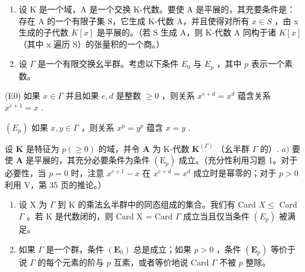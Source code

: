 \BourbakiExerciseGroup

\begin{enumerate}
\def\labelenumi{\arabic{enumi})}
\item
  设 K 是一个域，A 是一个交换 K-代数。要使 A 是平展的，其充要条件是：存在 A 的一个有限子集 S，它生成 K-代数 A，并且使得对所有 \(x \in S\) ，由 x 生成的子代数 \(K[x]\) 是平展的。（若 S 生成 A，则 K-代数 A 同构于诸 \(K[x]\) （其中 x 遍历 S）的张量积的一个商。）
\item
  设 \(\Gamma\) 是一个有限交换幺半群。考虑以下条件 \(E_0\) 与 \(E_p\) ，其中 \(p\) 表示一个素数。
\end{enumerate}

(E0) 如果 \(x \in \Gamma\) 并且如果 \(e, d\) 是整数 \(\geqslant 0\) ，则关系 \(x^{e + d} = x^d\) 蕴含关系 \(x^{e + 1} = x\) .

\((E_p)\) 如果 \(x, y \in \Gamma\) ，则关系 \(x^p = y^p\) 蕴含 \(x = y\) .

设 \(\mathbf{K}\) 是特征为 \(p (\geqslant 0)\) 的域，并令 \(\mathbf{A}\) 为 K-代数 \(\mathbf{K}^{(\Gamma)}\) （幺半群 \(\Gamma\) 的）. \(a)\) 要使 \(\mathbf{A}\) 是平展的，其充分必要条件为条件 \((\mathrm{E}_p)\) 成立。（充分性利用习题 1。对于必要性，当 \(p = 0\) 时，注意 \(x^{e+1} - x\) 在 \(x^{e+d} = x^d\) 成立时是幂零的；对于 \(p > 0\) 利用 V，第 35 页的推论。）

\begin{enumerate}
\def\labelenumi{\alph{enumi})}
\setcounter{enumi}{1}
\item
  设 X 为 \(\Gamma\) 到 K 的乘法幺半群中的同态组成的集合。我们有 Card \(X \leqslant\) Card \(\Gamma\) 。若 K 是代数闭的，则 Card X = Card \(\Gamma\) 成立当且仅当条件 \((E_{p})\) 被满足。
\item
  如果 \(\Gamma\) 是一个群，条件 \((\mathbf{E}_0)\) 总是成立；如果 \(p > 0\) ，条件 \((\mathbf{E}_p)\) 等价于说 \(\Gamma\) 的每个元素的阶与 \(p\) 互素，或者等价地说 Card \(\Gamma\) 不被 \(p\) 整除。
\end{enumerate}

